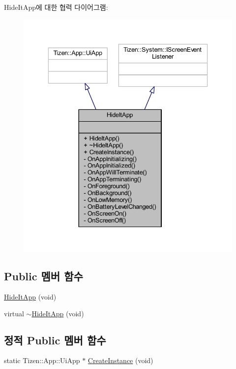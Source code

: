 Hide\+It\+App에 대한 협력 다이어그램\+:
\nopagebreak
\begin{figure}[H]
\begin{center}
\leavevmode
\includegraphics[width=336pt]{class_hide_it_app__coll__graph}
\end{center}
\end{figure}
\subsection*{Public 멤버 함수}
\begin{DoxyCompactItemize}
\item 
\hyperlink{class_hide_it_app_a25b287e17fde1028b896562d9aec209d}{Hide\+It\+App} (void)
\item 
virtual \hyperlink{class_hide_it_app_a7ed9f1059ff2914a7fea9b4980601e86}{$\sim$\+Hide\+It\+App} (void)
\end{DoxyCompactItemize}
\subsection*{정적 Public 멤버 함수}
\begin{DoxyCompactItemize}
\item 
static Tizen\+::\+App\+::\+Ui\+App $\ast$ \hyperlink{class_hide_it_app_a4f97afacfa7f884ebb25b365d7b54ced}{Create\+Instance} (void)
\end{DoxyCompactItemize}
